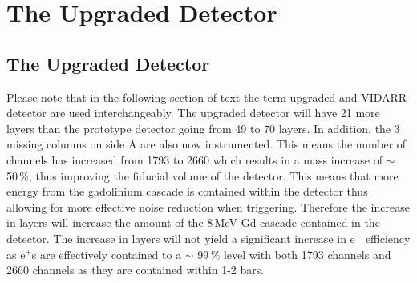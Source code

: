 \chapter{The Upgraded Detector} \label{Chp:TheUpgradedDetector}

\ifpdf
    \graphicspath{{Chapter3/Figs/Raster/}{Chapter3/Figs/PDF/}{Chapter3/Figs/}}
\else
    \graphicspath{{Chapter3/Figs/Vector/}{Chapter3/Figs/}}
\fi

\section{The Upgraded Detector}\label{sec:theUpgradedDetector}
Please note that in the following section of text the term upgraded and VIDARR detector are used interchangeably. The upgraded detector will have 21 more layers than the prototype detector going from 49 to 70 layers. In addition, the 3 missing columns on side A are also now instrumented. This means the number of channels has increased from 1793 to 2660 which results in a mass increase of $\sim$ 50\,\%, thus improving the fiducial volume of the detector. This means that more energy from the gadolinium cascade is contained within the detector thus allowing for more effective noise reduction when triggering. Therefore the increase in layers will increase the amount of the 8\,MeV Gd cascade contained in the detector. The increase in layers will not yield a significant increase in e$^+$ efficiency as e$^+$s are effectively contained to a $\sim$ 99\,\% level with both 1793 channels and 2660 channels as they are contained within 1-2 bars.
